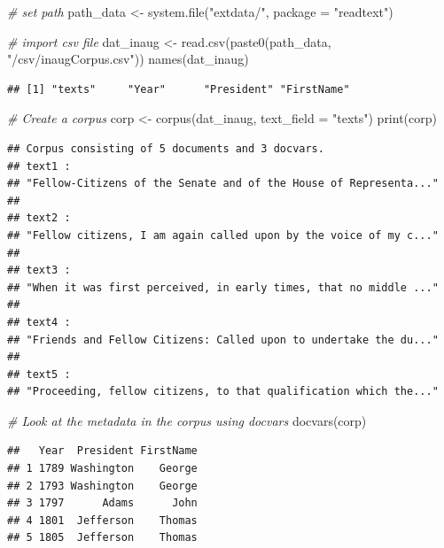 \documentclass[
  12pt,
]{style/krantz}
\newenvironment{Shaded}{\begin{snugshade}}{\end{snugshade}}
\newcommand{\AttributeTok}[1]{\textcolor[rgb]{0.77,0.63,0.00}{#1}}
\newcommand{\CommentTok}[1]{\textcolor[rgb]{0.56,0.35,0.01}{\textit{#1}}}
\newcommand{\FunctionTok}[1]{\textcolor[rgb]{0.00,0.00,0.00}{#1}}
\newcommand{\NormalTok}[1]{#1}
\newcommand{\OtherTok}[1]{\textcolor[rgb]{0.56,0.35,0.01}{#1}}
\newcommand{\StringTok}[1]{\textcolor[rgb]{0.31,0.60,0.02}{#1}}
\begin{document}
\begin{Shaded}
\begin{Highlighting}[]
\CommentTok{\# set path}
\NormalTok{path\_data }\OtherTok{\textless{}{-}} \FunctionTok{system.file}\NormalTok{(}\StringTok{"extdata/"}\NormalTok{, }\AttributeTok{package =} \StringTok{"readtext"}\NormalTok{)}

\CommentTok{\# import csv file}
\NormalTok{dat\_inaug }\OtherTok{\textless{}{-}} \FunctionTok{read.csv}\NormalTok{(}\FunctionTok{paste0}\NormalTok{(path\_data, }\StringTok{"/csv/inaugCorpus.csv"}\NormalTok{))}
\FunctionTok{names}\NormalTok{(dat\_inaug)}
\end{Highlighting}
\end{Shaded}

\begin{verbatim}
## [1] "texts"     "Year"      "President" "FirstName"
\end{verbatim}

\begin{Shaded}
\begin{Highlighting}[]
\CommentTok{\# Create a corpus}
\NormalTok{corp }\OtherTok{\textless{}{-}} \FunctionTok{corpus}\NormalTok{(dat\_inaug, }\AttributeTok{text\_field =} \StringTok{"texts"}\NormalTok{)}
\FunctionTok{print}\NormalTok{(corp)}
\end{Highlighting}
\end{Shaded}

\begin{verbatim}
## Corpus consisting of 5 documents and 3 docvars.
## text1 :
## "Fellow-Citizens of the Senate and of the House of Representa..."
## 
## text2 :
## "Fellow citizens, I am again called upon by the voice of my c..."
## 
## text3 :
## "When it was first perceived, in early times, that no middle ..."
## 
## text4 :
## "Friends and Fellow Citizens: Called upon to undertake the du..."
## 
## text5 :
## "Proceeding, fellow citizens, to that qualification which the..."
\end{verbatim}

\begin{Shaded}
\begin{Highlighting}[]
\CommentTok{\# Look at the metadata in the corpus using \textasciigrave{}docvars\textasciigrave{}}
\FunctionTok{docvars}\NormalTok{(corp)}
\end{Highlighting}
\end{Shaded}

\begin{verbatim}
##   Year  President FirstName
## 1 1789 Washington    George
## 2 1793 Washington    George
## 3 1797      Adams      John
## 4 1801  Jefferson    Thomas
## 5 1805  Jefferson    Thomas
\end{verbatim}
\end{document}
